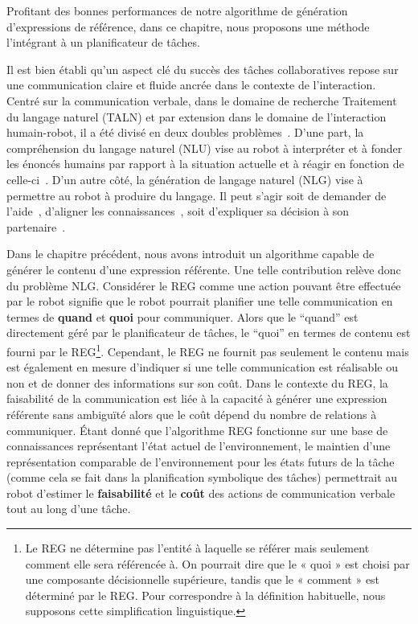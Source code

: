Profitant des bonnes performances de notre algorithme de génération d'expressions de référence, dans ce chapitre, nous proposons une méthode l'intégrant à un planificateur de tâches.

Il est bien établi qu'un aspect clé du succès des tâches collaboratives repose sur une communication claire et fluide ancrée dans le contexte de l'interaction. Centré sur la communication verbale, dans le domaine de recherche Traitement du langage naturel (TALN) et par extension dans le domaine de l'interaction humain-robot, il a été divisé en deux doubles problèmes~\cite{tellex_2020_robots}. D'une part, la compréhension du langage naturel (NLU) vise au robot à interpréter et à fonder les énoncés humains par rapport à la situation actuelle et à réagir en fonction de celle-ci~\cite{brawer_2018_situated}. D'un autre côté, la génération de langage naturel (NLG) vise à permettre au robot à produire du langage. Il peut s'agir soit de demander de l'aide~\cite{tellex_2014_asking}, d'aligner les connaissances~\cite{devin_2016_implemented}, soit d'expliquer sa décision à son partenaire~\cite{roncone_2017_transparent}.

Dans le chapitre précédent, nous avons introduit un algorithme capable de générer le contenu d'une expression référente. Une telle contribution relève donc du problème NLG. Considérer le REG comme une action pouvant être effectuée par le robot signifie que le robot pourrait planifier une telle communication en termes de \textbf{quand} et \textbf{quoi} pour communiquer. Alors que le ``quand'' est directement géré par le planificateur de tâches, le ``quoi'' en termes de contenu est fourni par le REG\footnote{Le REG ne détermine pas l'entité à laquelle se référer mais seulement comment elle sera référencée à. On pourrait dire que le « quoi » est choisi par une composante décisionnelle supérieure, tandis que le « comment » est déterminé par le REG. Pour correspondre à la définition habituelle, nous supposons cette simplification linguistique. }. Cependant, le REG ne fournit pas seulement le contenu mais est également en mesure d'indiquer si une telle communication est réalisable ou non et de donner des informations sur son coût. Dans le contexte du REG, la faisabilité de la communication est liée à la capacité à générer une expression référente sans ambiguïté alors que le coût dépend du nombre de relations à communiquer. Étant donné que l'algorithme REG fonctionne sur une base de connaissances représentant l'état actuel de l'environnement, le maintien d'une représentation comparable de l'environnement pour les états futurs de la tâche (comme cela se fait dans la planification symbolique des tâches) permettrait au robot d'estimer le \textbf {faisabilité} et le \textbf{coût} des actions de communication verbale tout au long d'une tâche.

